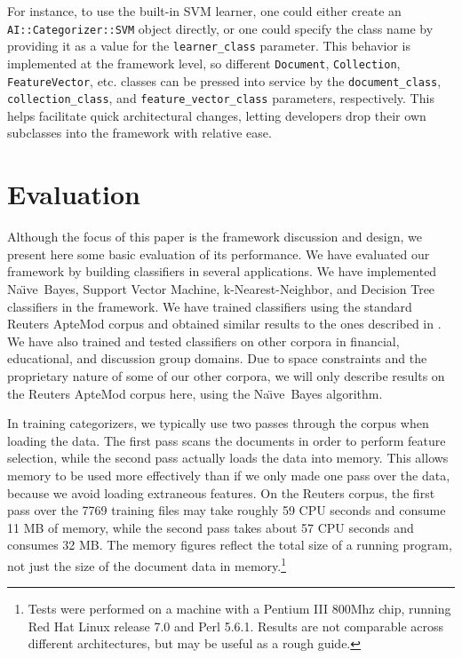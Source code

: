 \documentclass[twocolumn]{article}
\newcommand{\naive}{Na\"\i ve}
\newcommand{\class}[1]{\texttt{#1}}
\newcommand{\param}[1]{\texttt{#1}}
\newcommand{\aicat}{\texttt{AI::Cat\-e\-gor\-i\-zer}}
\begin{document}
For instance, to use the built-in SVM learner, one could either create
an \aicat\texttt{::SVM} object directly, or one could specify
the class name by providing it as a value for the
\param{learner\_class} parameter.  This behavior is implemented at
the framework level, so different \class{Document},
\class{Collection}, \class{FeatureVector}, etc. classes can be
pressed into service by the \param{document\_class},
\param{collection\_class}, and \param{feature\_vector\_class}
parameters, respectively.  This helps facilitate quick architectural
changes, letting developers drop their own subclasses into the
framework with relative ease.


\section{Evaluation}

Although the focus of this paper is the framework discussion and
design, we present here some basic evaluation of its performance.
We have evaluated our framework by building classifiers in several
applications.  We have implemented \naive\ Bayes, Support Vector
Machine, k-Nearest-Neighbor, and Decision Tree classifiers in the
framework.  We have trained classifiers using the standard Reuters
ApteMod corpus and obtained similar results to the ones described in
\cite{yang:99}.  We have also trained and tested classifiers on other
corpora in financial, educational, and discussion group domains.  Due
to space constraints and the proprietary nature of some of our other
corpora, we will only describe results on the Reuters ApteMod corpus
here, using the \naive\ Bayes algorithm.

In training categorizers, we typically use two passes through the
corpus when loading the data.  The first pass scans the documents in
order to perform feature selection, while the second pass actually
loads the data into memory.  This allows memory to be used more
effectively than if we only made one pass over the data, because we
avoid loading extraneous features.  On the Reuters corpus, the first
pass over the 7769 training files may take roughly 59 CPU seconds and
consume 11 MB of memory, while the second pass takes about 57 CPU
seconds and consumes 32 MB\@.  The memory figures reflect the total
size of a running program, not just the size of the document data in
memory.\footnote{Tests were performed on a machine with a Pentium III
800Mhz chip, running Red Hat Linux release 7.0 and Perl 5.6.1.
Results are not comparable across different architectures, but may be
useful as a rough guide.}
\end{document}
